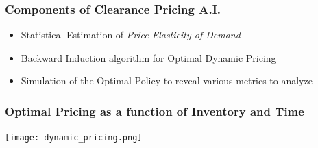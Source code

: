 \documentclass[handout]{beamer}
\begin{document}
\begin{frame}
\frametitle{Components of Clearance Pricing A.I.}
\pause
\begin{itemize}[<+->]
\item Statistical Estimation of {\em Price Elasticity of Demand}
\item Backward Induction algorithm for Optimal Dynamic Pricing
\item Simulation of the Optimal Policy to reveal various metrics to analyze
\end{itemize}
\end{frame}

\begin{frame}
\frametitle{Optimal Pricing as a function of Inventory and Time}
\texttt{[image: dynamic\_pricing.png]}
\end{frame}
\end{document}
